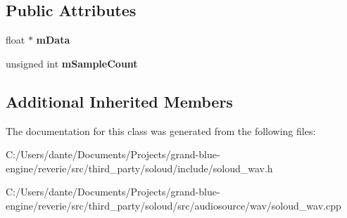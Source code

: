 \subsection*{Public Attributes}
\begin{DoxyCompactItemize}
\item 
\mbox{\label{class_so_loud_1_1_wav_a9c1c69df5dde076641f92d6553f3db38}} 
float $\ast$ {\bfseries m\+Data}
\item 
\mbox{\label{class_so_loud_1_1_wav_ac0cbf7aeb7bdcd19e2d2da58117c4ea3}} 
unsigned int {\bfseries m\+Sample\+Count}
\end{DoxyCompactItemize}
\subsection*{Additional Inherited Members}


The documentation for this class was generated from the following files\+:\begin{DoxyCompactItemize}
\item 
C\+:/\+Users/dante/\+Documents/\+Projects/grand-\/blue-\/engine/reverie/src/third\+\_\+party/soloud/include/soloud\+\_\+wav.\+h\item 
C\+:/\+Users/dante/\+Documents/\+Projects/grand-\/blue-\/engine/reverie/src/third\+\_\+party/soloud/src/audiosource/wav/soloud\+\_\+wav.\+cpp\end{DoxyCompactItemize}
